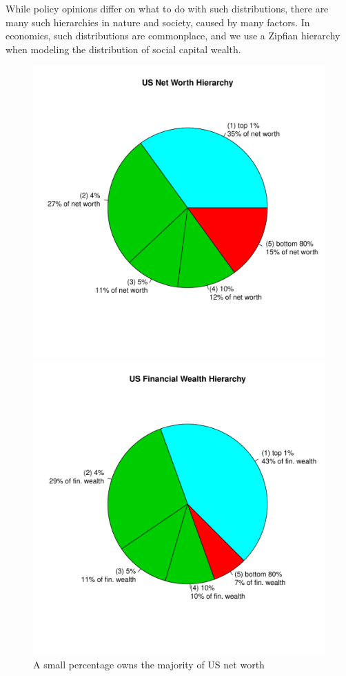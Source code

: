 \documentclass[10pt,oneside]{memoir}
\begin{document}
\begin{Spacing}{2}
While policy opinions differ on what to do with such distributions, there are many such hierarchies in nature and society, caused by many factors.  In economics, such distributions are commonplace, and we use a Zipfian hierarchy when modeling the distribution of social capital wealth.



\begin{figure}[ht]
    \centering
    \includegraphics[scale=0.5]{figures/us-net-worth-pie}
    \caption{A small percentage owns the majority of US net worth}
    \label{figure:us-net-worth-hierarchy}
\endminipage\hfill%
%
    \centering
    \includegraphics[scale=0.5]{figures/us-fin-wealth-pie-5pm}

\end{figure}
\end{Spacing}
\end{document}
